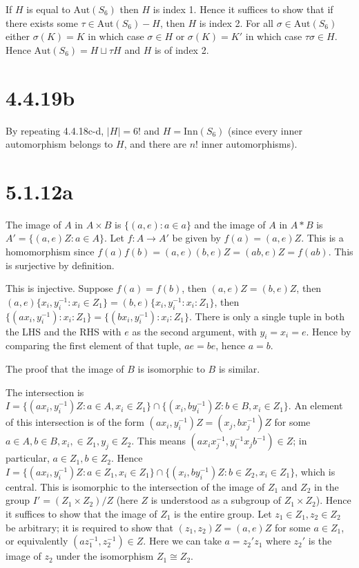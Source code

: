 \documentclass{article}
\def\inv{{-1}}
\def\Aut{\textrm{Aut}}
\def\Inn{\textrm{Inn}}
\begin{document}
If $H$ is equal to $\Aut(S_6)$ then $H$ is index 1. Hence it suffices to show that if there exists some $\tau \in \Aut(S_6) - H$, then $H$ is index 2. For all $\sigma \in \Aut(S_6)$ either $\sigma(K) = K$ in which case $\sigma \in H$ or $\sigma(K) = K'$ in which case $\tau\sigma \in H$. Hence $\Aut(S_6) = H \sqcup \tau H$ and $H$ is of index 2.

\section*{4.4.19b}

By repeating 4.4.18c-d, $|H| = 6!$ and $H = \Inn(S_6)$ (since every inner automorphism belongs to $H$, and there are $n!$ inner automorphisms).

\section*{5.1.12a}

The image of $A$ in $A \times B$ is $\{(a, e) : a \in a\}$ and the image of $A$ in $A * B$ is $A' = \{(a, e)Z : a \in A\}$. Let $f : A \to A'$ be given by $f(a) = (a, e)Z$. This is a homomorphism since $f(a)f(b) = (a, e)(b, e)Z = (ab, e)Z = f(ab)$. This is surjective by definition.

This is injective. Suppose $f(a) = f(b)$, then $(a, e)Z = (b, e)Z$, then $(a, e)\{x_i, y_i^\inv : x_i \in Z_1\} = (b, e)\{x_i, y_i^\inv : x_i : Z_1\}$, then $\{(ax_i, y_i^\inv): x_i : Z_1\} = \{(bx_i, y_i^\inv): x_i : Z_1\}$. There is only a single tuple in both the LHS and the RHS with $e$ as the second argument, with $y_i = x_i = e$. Hence by comparing the first element of that tuple, $ae = be$, hence $a = b$.

The proof that the image of $B$ is isomorphic to $B$ is similar.

The intersection is $I = \{(ax_i, y_i^\inv)Z: a \in A, x_i \in Z_1\} \cap \{(x_i, by_i^\inv)Z: b \in B, x_i \in Z_1\}$. An element of this intersection is of the form $(ax_i, y_i^\inv)Z = (x_j, bx_j^\inv)Z$ for some $a \in A, b \in B, x_i, \in Z_1, y_j \in Z_2$. This means $(ax_i x_j^\inv, y_i^\inv x_jb^\inv) \in Z$; in particular, $a \in Z_1, b \in Z_2$. Hence $I = \{(ax_i, y_i^\inv)Z: a \in Z_1, x_i \in Z_1\} \cap \{(x_i, by_i^\inv)Z: b \in Z_2, x_i \in Z_1\}$, which is central. This is isomorphic to the intersection of the image of $Z_1$ and $Z_2$ in the group $I' = (Z_1 \times Z_2) / Z$ (here $Z$ is understood as a subgroup of $Z_1 \times Z_2$). Hence it suffices to show that the image of $Z_1$ is the entire group. Let $z_1 \in Z_1, z_2 \in Z_2$ be arbitrary; it is required to show that $(z_1, z_2)Z = (a, e)Z$ for some $a \in Z_1$, or equivalently $(az_1^\inv, z_2^\inv) \in Z$. Here we can take $a = z_2' z_1$ where $z_2'$ is the image of $z_2$ under the isomorphism $Z_1 \cong Z_2$.
\end{document}

